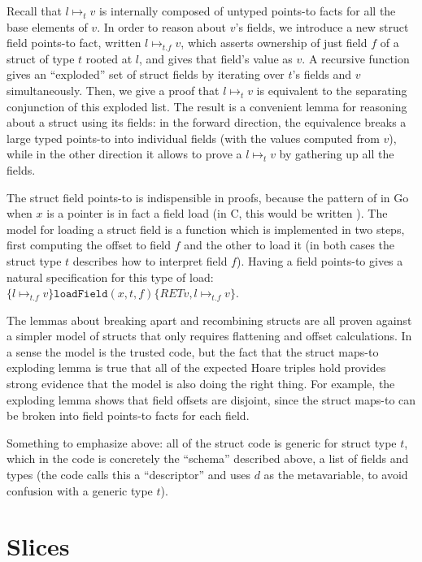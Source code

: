 Recall that $l \mapsto_t v$ is internally composed of untyped
points-to facts for all the base elements of $v$. In order to reason
about $v$'s fields, we introduce a new struct field points-to fact,
written $l \mapsto_{t.f} v$, which asserts ownership of just field
$f$ of a struct of type $t$ rooted at $l$, and gives that field's
value as $v$. A recursive function gives an ``exploded'' set of struct
fields by iterating over $t$'s fields and $v$ simultaneously. Then,
we give a proof that $l \mapsto_t v$ is equivalent to the separating
conjunction of this exploded list. The result is a convenient lemma for
reasoning about a struct using its fields: in the forward direction, the
equivalence breaks a large typed points-to into individual fields (with
the values computed from $v$), while in the other direction it allows
to prove a $l \mapsto_t v$ by gathering up all the fields.

The struct field points-to is indispensible in proofs, because the
pattern of  in Go when $x$ is a pointer is in fact a field
load (in C, this would be written ). The model
for loading a struct field is a function 
which is implemented in two steps, first computing the offset to field
$f$ and the other to load it (in both cases the struct type $t$
describes how to interpret field $f$). Having a field points-to gives
a natural specification for this type of load:
$\{ l \mapsto_{t.f} v \} \mathtt{loadField}(x, t, f) \{ RET v, l \mapsto_{t.f} v\}$.

The lemmas about breaking apart and recombining structs are all proven
against a simpler model of structs that only requires flattening and
offset calculations. In a sense the model is the trusted code, but the
fact that the struct maps-to exploding lemma is true that all of the
expected Hoare triples hold provides strong evidence that the model is
also doing the right thing. For example, the exploding lemma shows that
field offsets are disjoint, since the struct maps-to can be broken into
field points-to facts for each field.

Something to emphasize above: all of the struct code is generic for
struct type $t$, which in the code is concretely the ``schema''
described above, a list of fields and types (the code calls this a
``descriptor'' and uses $d$ as the metavariable, to avoid confusion
with a generic type $t$).

\section{Slices}

